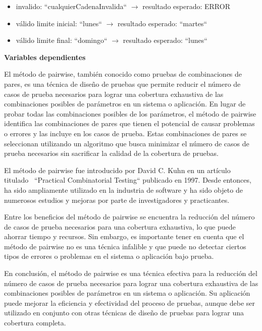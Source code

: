 \begin{itemize}
    \item invalido: “cualquierCadenaInvalida“ \(\longrightarrow\) resultado esperado: ERROR
    \item válido limite inicial: “lunes“ \(\longrightarrow\) resultado esperado: “martes“
    \item válido limite final: “domingo“ \(\longrightarrow\) resultado esperado: “lunes“
\end{itemize}

\textbf{Variables dependientes}\label{variablesDependendientes}

El método de pairwise, también conocido como pruebas de combinaciones de pares, es una técnica de diseño de pruebas que permite reducir el número de casos de prueba necesarios para lograr una cobertura exhaustiva de las combinaciones posibles de parámetros en un sistema o aplicación. En lugar de probar todas las combinaciones posibles de los parámetros, el método de pairwise identifica las combinaciones de pares que tienen el potencial de causar problemas o errores y las incluye en los casos de prueba. Estas combinaciones de pares se seleccionan utilizando un algoritmo que busca minimizar el número de casos de prueba necesarios sin sacrificar la calidad de la cobertura de pruebas.

El método de pairwise fue introducido por David C. Kuhn en un artículo titulado~\cite{37051} “Practical Combinatorial Testing“ publicado en 1997. Desde entonces, ha sido ampliamente utilizado en la industria de software y ha sido objeto de numerosos estudios y mejoras por parte de investigadores y practicantes.

Entre los beneficios del método de pairwise se encuentra la reducción del número de casos de prueba necesarios para una cobertura exhaustiva, lo que puede ahorrar tiempo y recursos. Sin embargo, es importante tener en cuenta que el método de pairwise no es una técnica infalible y que puede no detectar ciertos tipos de errores o problemas en el sistema o aplicación bajo prueba.

En conclusión, el método de pairwise es una técnica efectiva para la reducción del número de casos de prueba necesarios para lograr una cobertura exhaustiva de las combinaciones posibles de parámetros en un sistema o aplicación. Su aplicación puede mejorar la eficiencia y efectividad del proceso de pruebas, aunque debe ser utilizado en conjunto con otras técnicas de diseño de pruebas para lograr una cobertura completa.

